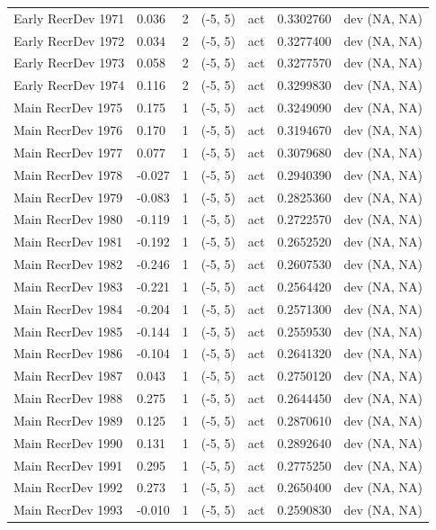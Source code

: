 \documentclass[11pt,
  english,
  a4paper,
]{article}
\begin{document}
\begin{landscape}
\begin{longtable}[t]{>{\raggedright\arraybackslash}p{7cm}lllll>{\raggedright\arraybackslash}p{4cm}}
Early RecrDev 1971 & 0.036 & 2 & (-5, 5) & act & 0.3302760 & dev (NA, NA)\\
Early RecrDev 1972 & 0.034 & 2 & (-5, 5) & act & 0.3277400 & dev (NA, NA)\\
Early RecrDev 1973 & 0.058 & 2 & (-5, 5) & act & 0.3277570 & dev (NA, NA)\\
Early RecrDev 1974 & 0.116 & 2 & (-5, 5) & act & 0.3299830 & dev (NA, NA)\\
Main RecrDev 1975 & 0.175 & 1 & (-5, 5) & act & 0.3249090 & dev (NA, NA)\\
Main RecrDev 1976 & 0.170 & 1 & (-5, 5) & act & 0.3194670 & dev (NA, NA)\\
Main RecrDev 1977 & 0.077 & 1 & (-5, 5) & act & 0.3079680 & dev (NA, NA)\\
Main RecrDev 1978 & -0.027 & 1 & (-5, 5) & act & 0.2940390 & dev (NA, NA)\\
Main RecrDev 1979 & -0.083 & 1 & (-5, 5) & act & 0.2825360 & dev (NA, NA)\\
Main RecrDev 1980 & -0.119 & 1 & (-5, 5) & act & 0.2722570 & dev (NA, NA)\\
Main RecrDev 1981 & -0.192 & 1 & (-5, 5) & act & 0.2652520 & dev (NA, NA)\\
Main RecrDev 1982 & -0.246 & 1 & (-5, 5) & act & 0.2607530 & dev (NA, NA)\\
Main RecrDev 1983 & -0.221 & 1 & (-5, 5) & act & 0.2564420 & dev (NA, NA)\\
Main RecrDev 1984 & -0.204 & 1 & (-5, 5) & act & 0.2571300 & dev (NA, NA)\\
Main RecrDev 1985 & -0.144 & 1 & (-5, 5) & act & 0.2559530 & dev (NA, NA)\\
Main RecrDev 1986 & -0.104 & 1 & (-5, 5) & act & 0.2641320 & dev (NA, NA)\\
Main RecrDev 1987 & 0.043 & 1 & (-5, 5) & act & 0.2750120 & dev (NA, NA)\\
Main RecrDev 1988 & 0.275 & 1 & (-5, 5) & act & 0.2644450 & dev (NA, NA)\\
Main RecrDev 1989 & 0.125 & 1 & (-5, 5) & act & 0.2870610 & dev (NA, NA)\\
Main RecrDev 1990 & 0.131 & 1 & (-5, 5) & act & 0.2892640 & dev (NA, NA)\\
Main RecrDev 1991 & 0.295 & 1 & (-5, 5) & act & 0.2775250 & dev (NA, NA)\\
Main RecrDev 1992 & 0.273 & 1 & (-5, 5) & act & 0.2650400 & dev (NA, NA)\\
Main RecrDev 1993 & -0.010 & 1 & (-5, 5) & act & 0.2590830 & dev (NA, NA)\\

\end{longtable}
\end{landscape}
\end{document}
